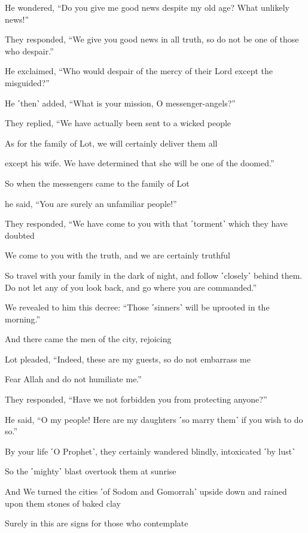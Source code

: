 He wondered, “Do you give me good news despite my old age? What unlikely news!”

They responded, “We give you good news in all truth, so do not be one of those who despair.”

He exclaimed, “Who would despair of the mercy of their Lord except the misguided?”

He ˹then˺ added, “What is your mission, O messenger-angels?”

They replied, “We have actually been sent to a wicked people

As for the family of Lot, we will certainly deliver them all

except his wife. We have determined that she will be one of the doomed.”

So when the messengers came to the family of Lot

he said, “You are surely an unfamiliar people!”

They responded, “We have come to you with that ˹torment˺ which they have doubted

We come to you with the truth, and we are certainly truthful

So travel with your family in the dark of night, and follow ˹closely˺ behind them. Do not let any of you look back, and go where you are commanded.”

We revealed to him this decree: “Those ˹sinners˺ will be uprooted in the morning.”

And there came the men of the city, rejoicing

Lot pleaded, “Indeed, these are my guests, so do not embarrass me

Fear Allah and do not humiliate me.”

They responded, “Have we not forbidden you from protecting anyone?”

He said, “O my people! Here are my daughters ˹so marry them˺ if you wish to do so.”

By your life ˹O Prophet˺, they certainly wandered blindly, intoxicated ˹by lust˺

So the ˹mighty˺ blast overtook them at sunrise

And We turned the cities ˹of Sodom and Gomorrah˺ upside down and rained upon them stones of baked clay

Surely in this are signs for those who contemplate

